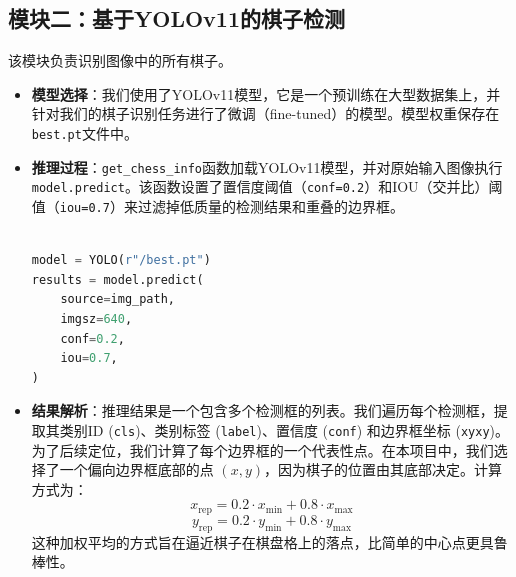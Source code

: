 \documentclass[12pt, a4paper]{article}
\begin{document}
\subsection{模块二：基于YOLOv11的棋子检测}
该模块负责识别图像中的所有棋子。
\begin{itemize}
    \item \textbf{模型选择}：我们使用了YOLOv11模型，它是一个预训练在大型数据集上，并针对我们的棋子识别任务进行了微调（fine-tuned）的模型。模型权重保存在\texttt{best.pt}文件中。
    \item \textbf{推理过程}：\texttt{get\_chess\_info}函数加载YOLOv11模型，并对原始输入图像执行\texttt{model.predict}。该函数设置了置信度阈值（\texttt{conf=0.2}）和IOU（交并比）阈值（\texttt{iou=0.7}）来过滤掉低质量的检测结果和重叠的边界框。
    \begin{lstlisting}[language=python, caption={YOLOv11 推理代码}]

model = YOLO(r"/best.pt")
results = model.predict(
    source=img_path,
    imgsz=640,
    conf=0.2,
    iou=0.7,
)
    \end{lstlisting}
    \item \textbf{结果解析}：推理结果是一个包含多个检测框的列表。我们遍历每个检测框，提取其类别ID (\texttt{cls})、类别标签 (\texttt{label})、置信度 (\texttt{conf}) 和边界框坐标 (\texttt{xyxy})。为了后续定位，我们计算了每个边界框的一个代表性点。在本项目中，我们选择了一个偏向边界框底部的点 $(x, y)$，因为棋子的位置由其底部决定。计算方式为：
    \[ x_{\text{rep}} = 0.2 \cdot x_{\text{min}} + 0.8 \cdot x_{\text{max}} \]
    \[ y_{\text{rep}} = 0.2 \cdot y_{\text{min}} + 0.8 \cdot y_{\text{max}} \]
    这种加权平均的方式旨在逼近棋子在棋盘格上的落点，比简单的中心点更具鲁棒性。
\end{itemize}
\end{document}
